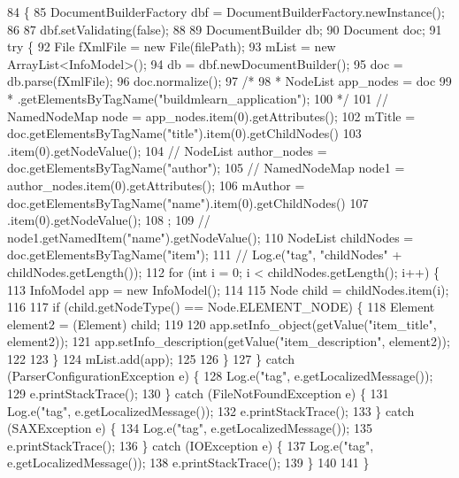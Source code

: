 \begin{DoxyCode}
84                                          \{
85         DocumentBuilderFactory dbf = DocumentBuilderFactory.newInstance();
86 
87         dbf.setValidating(\textcolor{keyword}{false});
88 
89         DocumentBuilder db;
90         Document doc;
91         \textcolor{keywordflow}{try} \{
92             File fXmlFile = \textcolor{keyword}{new} File(filePath);
93             mList = \textcolor{keyword}{new} ArrayList<InfoModel>();
94             db = dbf.newDocumentBuilder();
95             doc = db.parse(fXmlFile);
96             doc.normalize();
97             \textcolor{comment}{/*}
98 \textcolor{comment}{             * NodeList app\_nodes = doc
}
99 \textcolor{comment}{             * .getElementsByTagName("buildmlearn\_application");
}
100 \textcolor{comment}{             */}
101             \textcolor{comment}{// NamedNodeMap node = app\_nodes.item(0).getAttributes();}
102             mTitle = doc.getElementsByTagName(\textcolor{stringliteral}{"title"}).item(0).getChildNodes()
103                     .item(0).getNodeValue();
104             \textcolor{comment}{// NodeList author\_nodes = doc.getElementsByTagName("author");}
105             \textcolor{comment}{// NamedNodeMap node1 = author\_nodes.item(0).getAttributes();}
106             mAuthor = doc.getElementsByTagName(\textcolor{stringliteral}{"name"}).item(0).getChildNodes()
107                     .item(0).getNodeValue();
108             ;
109             \textcolor{comment}{// node1.getNamedItem("name").getNodeValue();}
110             NodeList childNodes = doc.getElementsByTagName(\textcolor{stringliteral}{"item"});
111             \textcolor{comment}{// Log.e("tag", "childNodes" + childNodes.getLength());}
112             \textcolor{keywordflow}{for} (\textcolor{keywordtype}{int} i = 0; i < childNodes.getLength(); i++) \{
113                 InfoModel app = \textcolor{keyword}{new} InfoModel();
114 
115                 Node child = childNodes.item(i);
116 
117                 \textcolor{keywordflow}{if} (child.getNodeType() == Node.ELEMENT\_NODE) \{
118                     Element element2 = (Element) child;
119 
120                     app.setInfo\_object(getValue(\textcolor{stringliteral}{"item\_title"}, element2));
121                     app.setInfo\_description(getValue(\textcolor{stringliteral}{"item\_description"}, element2));
122 
123                 \}
124                 mList.add(app);
125 
126             \}
127         \} \textcolor{keywordflow}{catch} (ParserConfigurationException e) \{
128             Log.e(\textcolor{stringliteral}{"tag"}, e.getLocalizedMessage());
129             e.printStackTrace();
130         \} \textcolor{keywordflow}{catch} (FileNotFoundException e) \{
131             Log.e(\textcolor{stringliteral}{"tag"}, e.getLocalizedMessage());
132             e.printStackTrace();
133         \} \textcolor{keywordflow}{catch} (SAXException e) \{
134             Log.e(\textcolor{stringliteral}{"tag"}, e.getLocalizedMessage());
135             e.printStackTrace();
136         \} \textcolor{keywordflow}{catch} (IOException e) \{
137             Log.e(\textcolor{stringliteral}{"tag"}, e.getLocalizedMessage());
138             e.printStackTrace();
139         \}
140 
141     \}
\end{DoxyCode}


